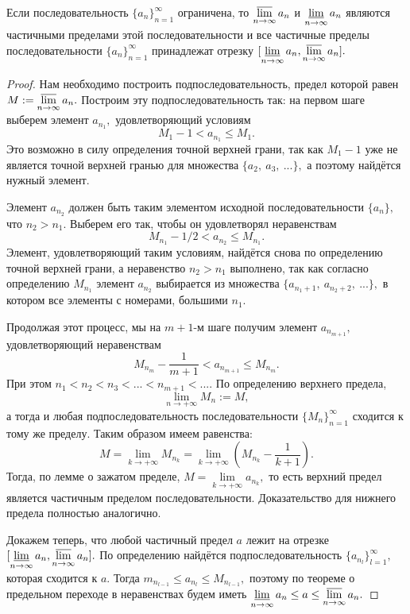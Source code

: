 \begin{theorem}
    Если последовательность $\{a_n\}_{n=1}^{\infty}$
    ограничена, то $\operatorname*{\overline{lim}}\limits_{n\rightarrow\infty}a_n$
    и $\operatorname*{\underline{lim}}\limits_{n\rightarrow\infty}a_n$ являются
    частичными пределами этой последовательности
    и все частичные пределы
    последовательности $\{a_n\}_{n=1}^{\infty}$
    принадлежат отрезку
    $[\operatorname*{\underline{lim}}\limits_{n\rightarrow\infty}a_n,
                \operatorname*{\overline{lim}}\limits_{n\rightarrow\infty}a_n].$
\end{theorem}
\begin{proof}
    Нам необходимо построить подпоследовательность,
    предел которой равен
    $M:=\operatorname*{\overline{lim}}\limits_{n\rightarrow\infty}a_n.$
    Построим эту подпоследовательность так:
    на первом шаге выберем элемент $a_{n_1},$
    удовлетворяющий условиям
    $$M_{1}-1<a_{n_1}\leq M_{1}.$$
    Это возможно
    в силу определения точной верхней грани, так
    как $M_1-1$ уже не является точной
    верхней гранью для множества
    $
        \{a_{2}, \ a_{3}, \ ...\},
    $
    а поэтому найдётся нужный элемент.

    Элемент $a_{n_2}$ должен быть таким
    элементом исходной последовательности
    $\{a_n\},$ что $n_2>n_1.$
    Выберем его так, чтобы он удовлетворял
    неравенствам
    $$M_{n_1}-1/2<a_{n_2}\leq M_{n_1}.$$
    Элемент, удовлетворяющий таким условиям,
    найдётся снова по определению точной
    верхней грани, а неравенство
    $n_2>n_1$ выполнено, так как согласно
    определению $M_{n_1}$ элемент $a_{n_2}$
    выбирается из множества
    $
        \{a_{n_1+1}, \ a_{n_2+2}, \ ...\},
    $
    в котором все элементы с номерами,
    большими $n_1.$

    Продолжая этот процесс,
    мы на $m+1$-м шаге получим элемент $a_{n_{m+1}},$
    удовлетворяющий неравенствам
    $$M_{n_{m}}-\frac{1}{m+1}<
        a_{n_{m+1}}\leq M_{n_{m}}.$$ При этом
    $n_1<n_2<n_3<...<n_{m+1}<... .$
    По определению верхнего предела,
    $$\lim\limits_{n\rightarrow+\infty}M_n:=M,$$ а тогда
    и любая подпоследовательность
    последовательности $\{M_n\}_{n=1}^{\infty}$
    сходится к тому же пределу.
    Таким образом имеем равенства:
    $$M=\lim\limits_{k\rightarrow+\infty}M_{n_k}=
        \lim\limits_{k\rightarrow+\infty}
        \left(M_{n_{k}}-\frac{1}{k+1}\right).$$
    Тогда, по лемме о зажатом пределе,
    $M=\lim\limits_{k\rightarrow+\infty}a_{n_k},$
    то есть верхний предел является
    частичным пределом последовательности.
    Доказательство для нижнего предела
    полностью аналогично.

    Докажем теперь, что любой частичный
    предел $a$ лежит на отрезке
    $[\operatorname*{\underline{lim}}\limits_{n\rightarrow\infty}a_n,
                \operatorname*{\overline{lim}}\limits_{n\rightarrow\infty}a_n].$
    По определению найдётся подпоследовательность
    $\{a_{n_l}\}_{l=1}^{\infty},$ которая
    сходится к $a.$ Тогда $m_{n_{l-1}}\leq
        a_{n_l}\leq M_{n_{l-1}},$ поэтому по теореме
    о предельном переходе в неравенствах будем
    иметь
    $\operatorname*{\underline{lim}}\limits_{n\rightarrow\infty}a_n
        \leq a\leq
        \operatorname*{\overline{lim}}\limits_{n\rightarrow\infty}a_n.$
\end{proof}

